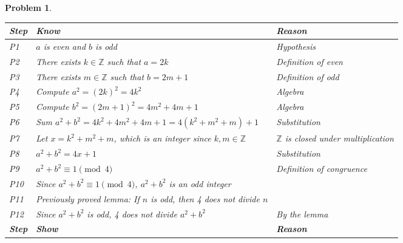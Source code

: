 \documentclass[12pt]{article}
\newtheorem{problem}{Problem} %
\theoremstyle{definition}
\begin{document}
\begin{problem}
\begin{enumerate}[label=(\alph*)]
    \begin{center}
        \begin{tabular}{|p{}|p{}|p{}|}
        \hline
        \textbf{Step} & \textbf{Know} & \textbf{Reason} \\
        \hline
            P1 & \( a \) is even and \( b \) is odd & Hypothesis \\
        \hline
            P2 & There exists \( k \in \mathbb{Z} \) such that \( a = 2k \) & Definition of even \\
        \hline
            P3 & There exists \( m \in \mathbb{Z} \) such that \( b = 2m + 1 \) & Definition of odd \\
        \hline
            P4 & Compute \( a^2 = (2k)^2 = 4k^2 \) & Algebra \\
        \hline
            P5 & Compute \( b^2 = (2m+1)^2 = 4m^2 + 4m + 1 \) & Algebra \\
        \hline
            P6 & Sum \( a^2 + b^2 = 4k^2 + 4m^2 + 4m + 1 = 4(k^2 + m^2 + m) + 1 \) & Substitution \\
        \hline
            P7 & Let \( x = k^2 + m^2 + m \), which is an integer since \( k, m \in \mathbb{Z} \) & \( \mathbb{Z} \) is closed under multiplication \\
        \hline
            P8 & \( a^2 + b^2 = 4x + 1 \) & Substitution \\
        \hline
            P9 & \( a^2 + b^2 \equiv 1 \pmod{4} \) & Definition of congruence \\
        \hline
            P10 & Since \( a^2 + b^2 \equiv 1 \pmod{4} \), \( a^2 + b^2 \) is an odd integer & \\
        \hline
            P11 & Previously proved lemma: If \( n \) is odd, then 4 does not divide \( n \) &  \\
        \hline
            P12 & Since \( a^2 + b^2 \) is odd, 4 does not divide \( a^2 + b^2 \) & By the lemma \\
        \hline
        \textbf{Step} & \textbf{Show} & \textbf{Reason} \\
        \hline
\end{tabular}

    \end{center}
    
\end{enumerate}
\end{problem}

\bigskip
\end{document}
